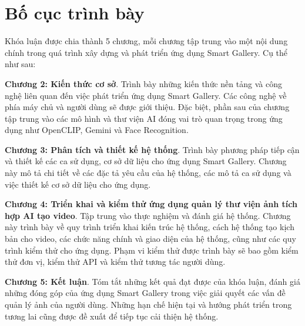 \section{Bố cục trình bày}
Khóa luận được chia thành 5 chương, mỗi chương tập trung vào một nội dung chính trong quá trình xây dựng và phát triển ứng dụng Smart Gallery. Cụ thể như sau:

\textbf{Chương 2: Kiến thức cơ sở}. Trình bày những kiến thức nền tảng và công nghệ liên quan đến việc phát triển ứng dụng Smart Gallery. Các công nghệ về phía máy chủ và người dùng sẽ được giới thiệu. Đặc biệt, phần sau của chương tập trung vào các mô hình và thư viện AI đóng vai trò quan trọng trong ứng dụng như OpenCLIP, Gemini và Face Recognition.

\textbf{Chương 3: Phân tích và thiết kế hệ thống}. Trình bày phương pháp tiếp cận và thiết kế các ca sử dụng, cơ sở dữ liệu cho ứng dụng Smart Gallery. Chương này mô tả chi tiết về các đặc tả yêu cầu của hệ thống, các mô tả ca sử dụng và việc thiết kế cơ sở dữ liệu cho ứng dụng. 

\textbf{Chương 4: Triển khai và kiểm thử ứng dụng quản lý thư viện ảnh tích hợp AI tạo video}. Tập trung vào thực nghiệm và đánh giá hệ thống. Chương này trình bày về quy trình triển khai kiến trúc hệ thống, cách hệ thống tạo kịch bản cho video, các chức năng chính và giao diện của hệ thống, cũng như các quy trình kiểm thử cho ứng dụng. Phạm vi kiểm thử được trình bày sẽ bao gồm kiểm thử đơn vị, kiểm thử API và kiểm thử tương tác người dùng. 

\textbf{Chương 5: Kết luận}. Tóm tắt những kết quả đạt được của khóa luận, đánh giá những đóng góp của ứng dụng Smart Gallery trong việc giải quyết các vấn đề quản lý ảnh của người dùng. Những hạn chế hiện tại và hướng phát triển trong tương lai cũng được đề xuất để tiếp tục cải thiện hệ thống.